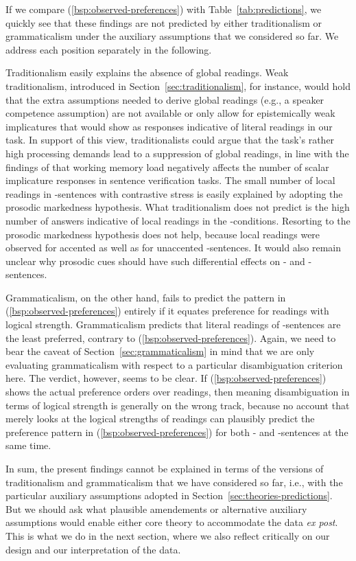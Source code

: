 \documentclass[fleqn,reqno,10pt]{article}
\newcommand{\as}{\acro{as}}
\renewcommand{\es}{\acro{es}}
\begin{document}
\noindent If we compare (\ref{bsp:observed-preferences}) with
Table~\ref{tab:predictions}, we quickly see that these findings are
not predicted by either traditionalism or grammaticalism under the
auxiliary assumptions that we considered so far. We address each
position separately in the following.

Traditionalism easily explains the absence of global readings. Weak
traditionalism, introduced in Section~\ref{sec:traditionalism}, for
instance, would hold that the extra assumptions needed to derive
global readings (e.g., a speaker competence assumption) are not
available or only allow for epistemically weak implicatures that would
show as responses indicative of literal readings in our task. In
support of this view, traditionalists could argue that the task's
rather high processing demands lead to a suppression of global
readings, in line with the findings of
\citet{NeysDe-NeysSchaeken2007:When-People-Are} that working memory
load negatively affects the number of scalar implicature responses in
sentence verification tasks. The small number of local readings in
\as-sentences with contrastive stress is easily explained by adopting
the prosodic markedness hypothesis. What traditionalism does not
predict is the high number of answers indicative of local readings in
the \es-conditions. Resorting to the prosodic markedness hypothesis
does not help, because local readings were observed for accented as
well as for unaccented \es-sentences. It would also remain unclear why
prosodic cues should have such differential effects on \as- and
\es-sentences.

Grammaticalism, on the other hand, fails to predict the pattern in
(\ref{bsp:observed-preferences}) entirely if it equates preference for
readings with logical strength. Grammaticalism predicts that literal
readings of \as-sentences are the least preferred, contrary to
(\ref{bsp:observed-preferences}). Again, we need to bear the caveat of
Section~\ref{sec:grammaticalism} in mind that we are only evaluating
grammaticalism with respect to a particular disambiguation criterion
here. The verdict, however, seems to be clear. If
(\ref{bsp:observed-preferences}) shows the actual preference orders
over readings, then meaning disambiguation in terms of logical
strength is generally on the wrong track, because no account that
merely looks at the logical strengths of readings can plausibly
predict the preference pattern in (\ref{bsp:observed-preferences}) for
both \as- and \es-sentences at the same time.

In sum, the present findings cannot be explained in terms of the
versions of traditionalism and grammaticalism that we have considered
so far, i.e., with the particular auxiliary assumptions adopted in
Section~\ref{sec:theories-predictions}. But we should ask what
plausible amendements or alternative auxiliary assumptions would
enable either core theory to accommodate the data \emph{ex post}. This
is what we do in the next section, where we also reflect critically on
our design and our interpretation of the data.
\end{document}
